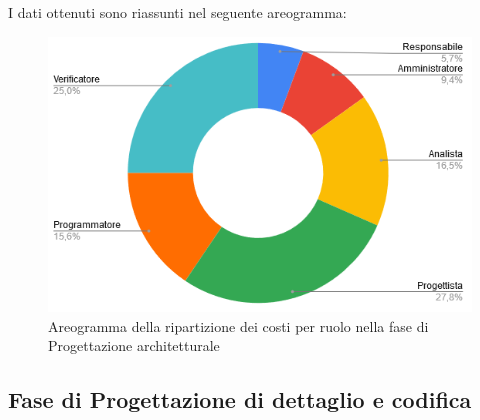 I dati ottenuti sono riassunti nel seguente areogramma:
\begin{figure}[H]
\centering
\includegraphics[scale=0.60]{img/grafici/torta_fase_prog_architetturale.png}
\caption{Areogramma della ripartizione dei costi per ruolo nella fase di Progettazione architetturale}
\end{figure}


\subsection{Fase di Progettazione di dettaglio e codifica}
